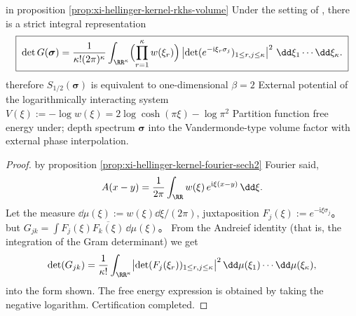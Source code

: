 \begin{proposition}\label{prop:xi-hellinger-kernel-andreief-loggas}
in proposition \ref{prop:xi-hellinger-kernel-rkhs-volume} Under the setting of , there is a strict integral representation
\[
\boxed{\;
\det G(\boldsymbol{\sigma})
=\frac{1}{\kappa!(2\pi)^{\kappa}}
\int_{\RR^\kappa}
\Bigl(\prod_{r=1}^{\kappa} w(\xi_r)\Bigr)\,
\bigl|\det(e^{-\mathrm{i}\xi_r\sigma_j})_{1\le r,j\le\kappa}\bigr|^{2}
\ \dd\xi_1\cdots \dd\xi_\kappa.\;}
\]
therefore \(S_{1/2}(\boldsymbol{\sigma})\) is equivalent to one-dimensional \(\beta=2\) External potential of the logarithmically interacting system
\(
V(\xi):=-\log w(\xi)=2\log\cosh(\pi\xi)-\log\pi^{2}
\)
Partition function free energy under; depth spectrum \(\boldsymbol{\sigma}\) into the Vandermonde-type volume factor with external phase interpolation.
\end{proposition}
\begin{proof}
by proposition \ref{prop:xi-hellinger-kernel-fourier-sech2} Fourier said,
\[
A(x-y)=\frac{1}{2\pi}\int_{\RR}w(\xi)\,e^{\mathrm{i}\xi(x-y)}\,\dd\xi.
\]
Let the measure \(\dd\mu(\xi):=w(\xi)\dd\xi/(2\pi)\), juxtaposition
\(
F_j(\xi):=e^{-\mathrm{i}\xi\sigma_j}
\)。
but \(G_{jk}=\int F_j(\xi)\overline{F_k(\xi)}\,\dd\mu(\xi)\)。
From the Andreief identity (that is, the integration of the Gram determinant) we get
\[
\det(G_{jk})
=\frac{1}{\kappa!}\int_{\RR^\kappa}\bigl|\det(F_j(\xi_r))_{1\le r,j\le\kappa}\bigr|^{2}\,\dd\mu(\xi_1)\cdots\dd\mu(\xi_\kappa),
\]
into the form shown. The free energy expression is obtained by taking the negative logarithm. Certification completed.
\end{proof}

